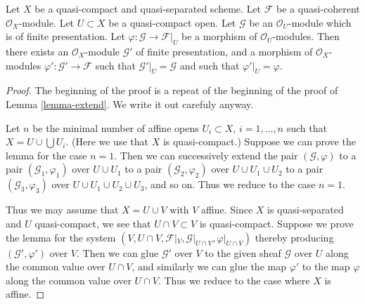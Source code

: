 \begin{lemma}
\label{lemma-extend-finite-presentation}
Let $X$ be a quasi-compact and quasi-separated scheme.
Let $\mathcal{F}$ be a quasi-coherent $\mathcal{O}_X$-module.
Let $U \subset X$ be a quasi-compact open.
Let $\mathcal{G}$ be an $\mathcal{O}_U$-module which is of finite presentation.
Let $\varphi : \mathcal{G} \to \mathcal{F}|_U$ be a morphism of
$\mathcal{O}_U$-modules.
Then there exists an $\mathcal{O}_X$-module
$\mathcal{G}'$ of finite presentation, and a morphism
of $\mathcal{O}_X$-modules $\varphi' : \mathcal{G}' \to \mathcal{F}$
such that $\mathcal{G}'|_U = \mathcal{G}$ and such that
$\varphi'|_U = \varphi$.
\end{lemma}

\begin{proof}
The beginning of the proof is a repeat of the beginning of the
proof of Lemma \ref{lemma-extend}. We write it out carefuly anyway.

\medskip\noindent
Let $n$ be the minimal number of affine opens $U_i \subset X$,
$i = 1, \ldots , n$ such that $X = U \cup \bigcup U_i$.
(Here we use that $X$ is quasi-compact.) Suppose
we can prove the lemma for the case $n = 1$. Then we can successively
extend the pair $(\mathcal{G}, \varphi)$
to a pair $(\mathcal{G}_1, \varphi_1)$ over $U \cup U_1$
to a pair $(\mathcal{G}_2, \varphi_2)$ over $U \cup U_1 \cup U_2$
to a pair $(\mathcal{G}_3, \varphi_3)$ over $U \cup U_1 \cup U_2 \cup U_3$,
and so on.
Thus we reduce to the case $n = 1$.

\medskip\noindent
Thus we may assume that $X = U \cup V$ with $V$ affine.
Since $X$ is quasi-separated and $U$ quasi-compact,
we see that $U \cap V \subset V$ is quasi-compact.
Suppose we prove the lemma for the system
$(V, U \cap V, \mathcal{F}|_V, \mathcal{G}|_{U \cap V}, \varphi|_{U \cap V})$
thereby producing $(\mathcal{G}', \varphi')$ over $V$.
Then we can glue $\mathcal{G}'$ over $V$ to the given sheaf $\mathcal{G}$
over $U$ along the common value over $U \cap V$, and similarly we can glue
the map $\varphi'$ to the map $\varphi$ along the common value over
$U \cap V$. Thus we reduce to the case where $X$ is affine.


\end{proof}
